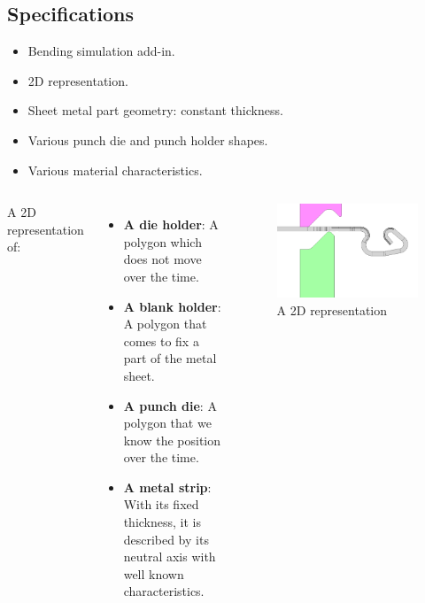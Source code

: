\documentclass{beamer}
\begin{document}
\subsection{Specifications}
\begin{frame}
    \begin{itemize}
        \item Bending simulation add-in.
        \item 2D representation.
        \item Sheet metal part geometry: constant thickness.
        \item Various punch die and punch holder shapes.
        \item Various material characteristics.
    \end{itemize}
\end{frame}
\begin{frame}
    \begin{columns}
        A 2D representation of:
        \begin{itemize}
            \item \textbf{A die holder}: 
                A polygon which does not move over the time.
            \item \textbf{A blank holder}:
                A polygon that comes to fix a part of the metal sheet.
            \item \textbf{A punch die}:
                A polygon that we know the position over the time.
            \item \textbf{A metal strip}:
                With its fixed thickness, it is described by its neutral axis with well known characteristics.
        \end{itemize}
        \begin{figure}
            \includegraphics[width=\textwidth]{img/fibreNeutre.jpg}
            \caption{A 2D representation}
            \label{FibreNeudre}
        \end{figure}
    \end{columns}
\end{frame}
\end{document}
